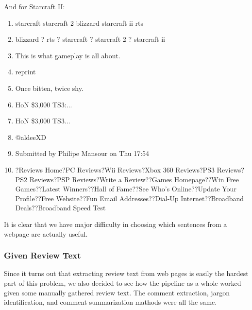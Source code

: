 \documentclass{article}
\begin{document}
And for Starcraft II:
\begin{enumerate}
\item starcraft
  starcraft 2
  blizzard
  starcraft ii
  rts
\item blizzard ? rts ? starcraft ? starcraft 2 ? starcraft ii
\item This is what gameplay is all about.
\item reprint
\item Once bitten, twice shy.
\item HoN \$3,000 TS3:...
\item HoN \$3,000 TS3...
\item @aldeeXD
\item Submitted by Philipe Mansour on Thu 17:54
\item?Reviews Home?PC Reviews?Wii Reviews?Xbox 360 Reviews?PS3 Reviews?PS2 Reviews?PSP Reviews?Write a Review??Games Homepage??Win Free Games??Latest Winners??Hall of Fame??See Who's Online??Update Your Profile??Free Website??Fun Email Addresses??Dial-Up Internet??Broadband Deals??Broadband Speed Test
\end{enumerate}

It is clear that we have major difficulty in choosing which sentences from a
webpage are actually useful.

\subsubsection{Given Review Text}

Since it turns out that extracting review text from web pages is easily the
hardest part of this problem, we also decided to see how the pipeline as a whole
worked given some manually gathered review text. The comment extraction,
jargon identification, and comment summarization mathods were all the same.
\end{document}

